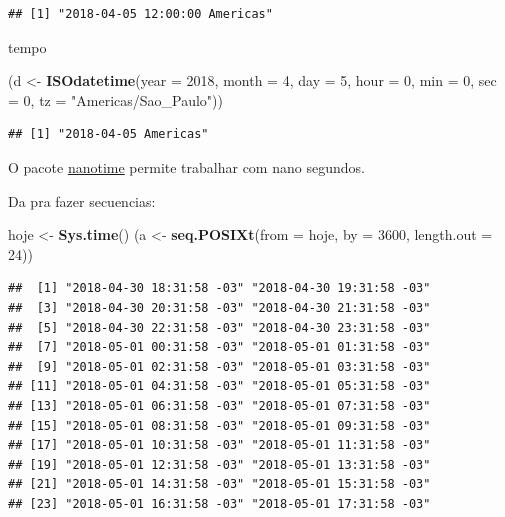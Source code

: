 \documentclass[]{book}
\newenvironment{Shaded}{\begin{snugshade}}{\end{snugshade}}
\newcommand{\KeywordTok}[1]{\textcolor[rgb]{0.13,0.29,0.53}{\textbf{#1}}}
\newcommand{\DataTypeTok}[1]{\textcolor[rgb]{0.13,0.29,0.53}{#1}}
\newcommand{\DecValTok}[1]{\textcolor[rgb]{0.00,0.00,0.81}{#1}}
\newcommand{\StringTok}[1]{\textcolor[rgb]{0.31,0.60,0.02}{#1}}
\newcommand{\NormalTok}[1]{#1}
\theoremstyle{definition}
\theoremstyle{definition}
\theoremstyle{definition}
\theoremstyle{remark}
\begin{document}
\begin{verbatim}
## [1] "2018-04-05 12:00:00 Americas"
\end{verbatim}

tempo

\begin{Shaded}
\begin{Highlighting}[]
\NormalTok{(d <-}\StringTok{ }\KeywordTok{ISOdatetime}\NormalTok{(}\DataTypeTok{year =} \DecValTok{2018}\NormalTok{, }\DataTypeTok{month =} \DecValTok{4}\NormalTok{, }\DataTypeTok{day =} \DecValTok{5}\NormalTok{, }\DataTypeTok{hour =} \DecValTok{0}\NormalTok{, }\DataTypeTok{min =} \DecValTok{0}\NormalTok{, }\DataTypeTok{sec =} \DecValTok{0}\NormalTok{,}
                  \DataTypeTok{tz =} \StringTok{"Americas/Sao_Paulo"}\NormalTok{))}
\end{Highlighting}
\end{Shaded}

\begin{verbatim}
## [1] "2018-04-05 Americas"
\end{verbatim}

O pacote \href{https://github.com/eddelbuettel/nanotime}{nanotime}
permite trabalhar com nano segundos.

Da pra fazer secuencias:

\begin{Shaded}
\begin{Highlighting}[]
\NormalTok{hoje <-}\StringTok{ }\KeywordTok{Sys.time}\NormalTok{()}
\NormalTok{(a <-}\StringTok{ }\KeywordTok{seq.POSIXt}\NormalTok{(}\DataTypeTok{from =}\NormalTok{ hoje, }\DataTypeTok{by =} \DecValTok{3600}\NormalTok{, }\DataTypeTok{length.out =} \DecValTok{24}\NormalTok{))}
\end{Highlighting}
\end{Shaded}

\begin{verbatim}
##  [1] "2018-04-30 18:31:58 -03" "2018-04-30 19:31:58 -03"
##  [3] "2018-04-30 20:31:58 -03" "2018-04-30 21:31:58 -03"
##  [5] "2018-04-30 22:31:58 -03" "2018-04-30 23:31:58 -03"
##  [7] "2018-05-01 00:31:58 -03" "2018-05-01 01:31:58 -03"
##  [9] "2018-05-01 02:31:58 -03" "2018-05-01 03:31:58 -03"
## [11] "2018-05-01 04:31:58 -03" "2018-05-01 05:31:58 -03"
## [13] "2018-05-01 06:31:58 -03" "2018-05-01 07:31:58 -03"
## [15] "2018-05-01 08:31:58 -03" "2018-05-01 09:31:58 -03"
## [17] "2018-05-01 10:31:58 -03" "2018-05-01 11:31:58 -03"
## [19] "2018-05-01 12:31:58 -03" "2018-05-01 13:31:58 -03"
## [21] "2018-05-01 14:31:58 -03" "2018-05-01 15:31:58 -03"
## [23] "2018-05-01 16:31:58 -03" "2018-05-01 17:31:58 -03"
\end{verbatim}
\end{document}
